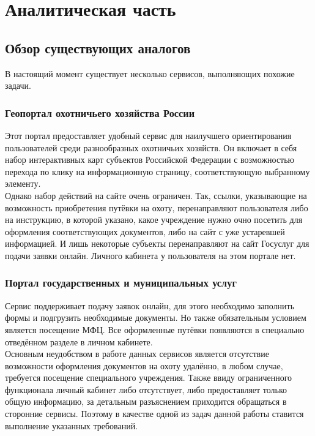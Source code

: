 \section{Аналитическая часть}	
	\subsection{Обзор существующих аналогов}
	В настоящий момент существует несколько сервисов, выполняющих похожие задачи.
	
	\subsubsection{Геопортал охотничьего хозяйства России}
	Этот портал предоставляет удобный сервис для наилучшего ориентирования пользователей среди разнообразных охотничьих хозяйств. Он включает в себя набор интерактивных карт субъектов Российской Федерации с возможностью перехода по клику на информационную страницу, соответствующую выбранному элементу. \cite{maps} \\
	
	Однако набор действий на сайте очень ограничен. Так, ссылки, указывающие на возможность приобретения путёвки на охоту, перенаправляют пользователя либо на инструкцию, в которой указано, какое учреждение нужно очно посетить для оформления соответствующих документов, либо на сайт с уже устаревшей информацией. И лишь некоторые субъекты перенаправляют на сайт Госуслуг для подачи заявки онлайн. Личного кабинета у пользователя на этом портале нет. \\
	
	\subsubsection{Портал государственных и муниципальных услуг}
	Сервис поддерживает подачу заявок онлайн, для этого необходимо заполнить формы и подгрузить необходимые документы. Но также обязательным условием является посещение МФЦ. Все оформленные путёвки появляются в специально отведённом разделе в личном кабинете.\\
	
	Основным неудобством в работе данных сервисов является отсутствие возможности оформления документов на охоту удалённо, в любом случае, требуется посещение специального учреждения. Также ввиду ограниченного функционала личный кабинет либо отсутствует, либо предоставляет только общую информацию, за детальным разъяснением приходится обращаться в сторонние сервисы. Поэтому в качестве одной из задач данной работы ставится выполнение указанных требований.
	
